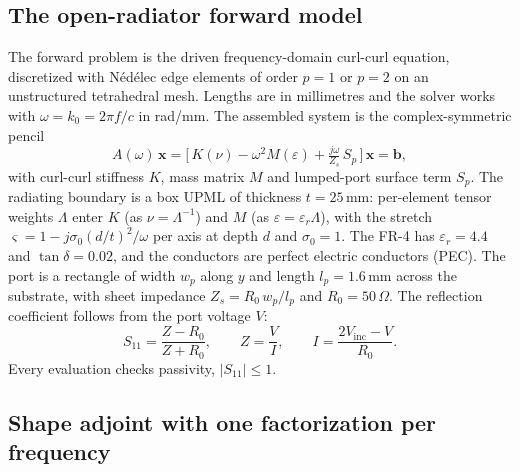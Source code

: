 \documentclass{anvil-paper}
\begin{document}
\subsection{The open-radiator forward model}
\label{sec:pencil}

The forward problem is the driven frequency-domain curl-curl equation,
discretized with N\'ed\'elec edge elements of order $p = 1$ or $p = 2$ on an
unstructured tetrahedral mesh. Lengths are in millimetres and the solver
works with $\omega = k_0 = 2\pi f/c$ in rad/mm. The assembled system is the
complex-symmetric pencil
\begin{equation}
  A(\omega)\,\mathbf{x}
  = \Big[\,K(\nu) - \omega^2 M(\varepsilon) + \tfrac{j\omega}{Z_s}\,S_p\,\Big]\,\mathbf{x}
  = \mathbf{b},
  \label{eq:pencil}
\end{equation}
with curl-curl stiffness $K$, mass matrix $M$ and lumped-port surface term
$S_p$. The radiating boundary is a box UPML of thickness $t = 25$\,mm:
per-element tensor weights $\Lambda$ enter $K$ (as $\nu = \Lambda^{-1}$) and
$M$ (as $\varepsilon = \varepsilon_r \Lambda$), with the stretch
$\varsigma = 1 - j\sigma_0 (d/t)^2/\omega$ per axis at depth $d$ and
$\sigma_0 = 1$. The FR-4 has $\varepsilon_r = 4.4$ and $\tan\delta = 0.02$,
and the conductors are perfect electric conductors (PEC). The port is a
rectangle of width $w_p$ along $y$ and length $l_p = 1.6$\,mm across the
substrate, with sheet impedance $Z_s = R_0\,w_p/l_p$ and $R_0 = 50\,\Omega$.
The reflection coefficient follows from the port voltage $V$:
\begin{equation}
  S_{11} = \frac{Z - R_0}{Z + R_0},\qquad Z = \frac{V}{I},\qquad
  I = \frac{2V_{\mathrm{inc}} - V}{R_0}.
  \label{eq:s11}
\end{equation}
Every evaluation checks passivity, $|S_{11}| \le 1$.

\subsection{Shape adjoint with one factorization per frequency}
\label{sec:adjoint}
\end{document}
